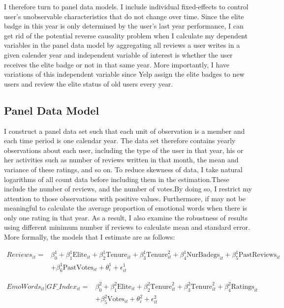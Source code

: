 \documentclass[12pt]{article}%
\begin{document}
I therefore turn to panel data models. I include individual fixed-effects to control user's unobservable characteristics that do not change over time. Since the elite badge in this year is only determined by the user's last year performance, I can get rid of the potential reverse causality problem when I calculate my dependent variables in the panel data model by aggregating all reviews a user writes in a given calender year and independent variable of interest is whether the user receives the elite badge or not in that same year. More importantly, I have variations of this independent variable since Yelp assign the elite badges to new users and review the elite status of old users every year.  


\subsection{Panel Data Model}
I construct a panel data set such that each unit of observation is a member and each time period is one calendar year. The data set therefore contains yearly observations about each user, including the type of the user in that year, his or her activities such as number of reviews written in that month, the mean and variance of these ratings, and so on. To reduce skewness of data, I take natural logarithms of all count data before including them in the estimation.These include the number of reviews, and the number of votes.By doing so, I restrict my attention to those observations with positive values.
Furthermore, if may not be meaningful to calculate the average proportion of emotional words when there is only one rating in that year. As a result, I also examine the robustness of results using different minimum number if reviews to calculate mean and standard error. More formally, the models that I estimate are as follows:

\begin{equation}
\begin{split}
Reviews_{it}=&\beta_0^1+\beta_1^1\text{Elite}_{it}+\beta_2^1\text{Tenure}_{it}+\beta_3^1\text{Tenure}_{it}^2+\beta_4^1\text{NurBadegs}_{it}+\beta_5^1\text{PastReviews}_{it}\\&+\beta_6^1\text{PastVotes}_{it}+\theta_{i}^1+\epsilon_{it}^1
\end{split}
\end{equation}

\begin{equation}
\begin{split}
EmoWords_{it}|GF\_Index_{it}=&\beta_0^2+\beta_1^2\text{Elite}_{it}+\beta_2^2\text{Tenure}_{it}^2+\beta_3^2\text{Tenure}_{it}^2+\beta_4^2\text{Ratings}_{it}\\&+\beta_5^2\text{Votes}_{it}+\theta_{i}^2+\epsilon_{it}^2
\end{split}
\end{equation}
\end{document}
